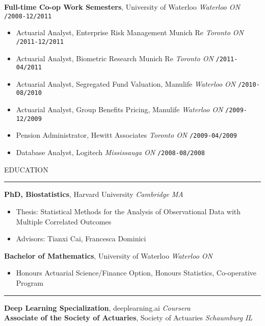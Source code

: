 \documentclass[10pt,english]{report}
\begin{document}
\textbf{Full-time Co-op Work Semesters}, University of Waterloo \hfill \textit{Waterloo ON} \texttt{/2008-12/2011}
\begin{itemize}
\item Actuarial Analyst, Enterprise Risk Management Munich Re \hfill \textit{Toronto ON} \texttt{/2011-12/2011}
\item Actuarial Analyst, Biometric Research Munich Re \hfill \textit{Toronto ON} \texttt{/2011-04/2011}
\item Actuarial Analyst, Segregated Fund Valuation, Manulife \hfill \textit{Waterloo ON} \texttt{/2010-08/2010}
\item Actuarial Analyst, Group Benefits Pricing, Manulife \hfill \textit{Waterloo ON} \texttt{/2009-12/2009}
\item Pension Administrator, Hewitt Associates \hfill \textit{Toronto ON} \texttt{/2009-04/2009}
\item Database Analyst, Logitech \hfill \textit{Mississauga ON} \texttt{/2008-08/2008}
\end{itemize}

\vspace{5mm}

{\centering\large{EDUCATION}\par}
\vspace{1mm}\hrule
\vspace{1mm}

\textbf{PhD, Biostatistics}, Harvard University \hfill \textit{Cambridge MA} \texttt{}
\begin{itemize}
\item Thesis: Statistical Methods for the Analysis of Observational Data with Multiple Correlated Outcomes
\item Advisors: Tianxi Cai, Francesca Dominici
\end{itemize}

\vspace{1mm}

\textbf{Bachelor of Mathematics}, University of Waterloo \hfill \textit{Waterloo ON} \texttt{}
\begin{itemize}
\item Honours Actuarial Science/Finance Option, Honours Statistics, Co-operative
Program
\end{itemize}

\vspace{1mm}
\vspace{1mm}\hrule
\vspace{1mm}

\textbf{Deep Learning Specialization}, deeplearning.ai \hfill \textit{Coursera} \texttt{} \\
\textbf{Associate of the Society of Actuaries}, Society of Actuaries \hfill \textit{Schaumburg IL} \texttt{}
\end{document}
